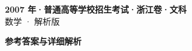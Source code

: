 \documentclass[zihao=-4, a4paper]{ctexart}
\begin{document}
\begin{center}
  {\Large\bfseries 2007 年·普通高等学校招生考试·浙江卷·文科}\\[4pt]
  {\large 数学 · 解析版}
\end{center}
\medskip
{}

\clearpage
{}
\begin{center}{\Large\bfseries 参考答案与详细解析}\end{center}
\medskip

\end{document}
